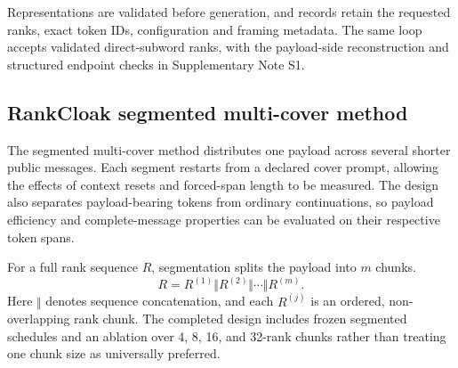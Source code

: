 \documentclass[fleqn,10pt]{wlscirep}
\begin{document}
Representations are validated before generation, and records retain the requested ranks, exact token IDs, configuration and framing metadata. The same loop accepts validated direct-subword ranks, with the payload-side reconstruction and structured endpoint checks in Supplementary Note S1.



\subsection*{RankCloak segmented multi-cover method}\label{sec:encoding-method}

The segmented multi-cover method distributes one payload across several shorter public messages. Each segment restarts from a declared cover prompt, allowing the effects of context resets and forced-span length to be measured. The design also separates payload-bearing tokens from ordinary continuations, so payload efficiency and complete-message properties can be evaluated on their respective token spans.

For a full rank sequence \(R\), segmentation splits the payload into \(m\) chunks.
\begin{equation}
R = R^{(1)}\Vert R^{(2)}\Vert \cdots \Vert R^{(m)}.
\label{eq:rank-segmentation}
\end{equation}
Here \(\Vert\) denotes sequence concatenation, and each \(R^{(j)}\) is an ordered, non-overlapping rank chunk. The completed design includes frozen segmented schedules and an ablation over 4, 8, 16, and 32-rank chunks rather than treating one chunk size as universally preferred.
\end{document}
